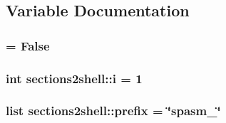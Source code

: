 \subsection{\-Variable \-Documentation}
\hypertarget{namespacesections2shell_a3667169ba9afc983db41b0b9aea336cb}{
\subsubsection[{header}]{ = \-False}}
\label{namespacesections2shell_a3667169ba9afc983db41b0b9aea336cb}
\hypertarget{namespacesections2shell_a4e78c48a579d23a2c6de71ac9359a9b9}{
\subsubsection[{i}]{\setlength{\rightskip}{0pt plus 5cm}int {\bf sections2shell\-::i} = 1}}
\label{namespacesections2shell_a4e78c48a579d23a2c6de71ac9359a9b9}
\hypertarget{namespacesections2shell_a61765c6e86e717fdfa778f3533b3b621}{
\subsubsection[{prefix}]{\setlength{\rightskip}{0pt plus 5cm}list {\bf sections2shell\-::prefix} = \char`\"{}spasm\-\_\-\char`\"{}}}
\label{namespacesections2shell_a61765c6e86e717fdfa778f3533b3b621}
